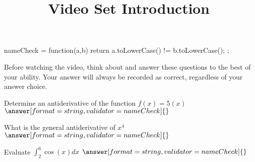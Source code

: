 \documentclass[handout]{ximera}
\title{Video Set Introduction}
\begin{document}
\begin{abstract}
\end{abstract}


\maketitle


\begin{javascript}
  nameCheck = function(a,b) {
    return a.toLowerCase() != b.toLowerCase();
  };
\end{javascript}

Before watching the video, think about and answer these questions to the best of your ability. Your answer will always be recorded as correct, regardless of your answer choice.

\begin{problem}
Determine an antiderivative of the function $f(x)=5(x)$
$\answer[format=string,validator=nameCheck]{}$
\end{problem}

\begin{problem}
What is the general antiderivative of $x^4$
$\answer[format=string,validator=nameCheck]{}$
\end{problem}

\begin{problem}
Evaluate $\int_2^6 \cos(x) dx$
$\answer[format=string,validator=nameCheck]{}$
\end{problem}
\end{document}

